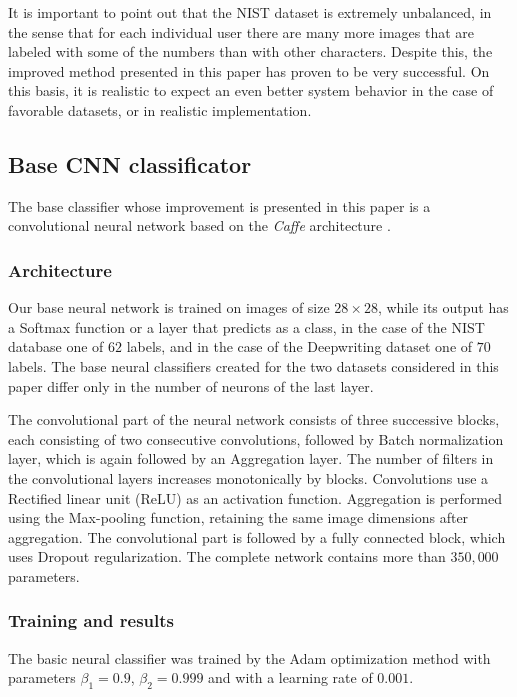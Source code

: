 \documentclass{article}
\begin{document}
It is important to point out that the NIST dataset is extremely unbalanced, in the sense that for each individual user there are many more images that are
labeled with some of the numbers than with other characters.
Despite this, the improved method presented in this paper has proven to be very successful.
On this basis, it is realistic to expect an even better system behavior in the case of favorable datasets, or in realistic implementation.

\subsection{Base CNN classificator}

The base classifier whose improvement is presented in this paper is a convolutional neural network based on the \textit{Caffe} architecture \citep{caffe}.

\subsubsection{Architecture}

Our base neural network is trained on images of size $28 \times 28$, while its output has a Softmax function or a layer that predicts as a class, in the case of the NIST database one of $62$ labels,
and in the case of the Deepwriting dataset one of $70$ labels.
The base neural classifiers created for the two datasets considered in this paper differ only in the number of neurons of the last layer.

The convolutional part of the neural network consists of three successive blocks, each consisting of two consecutive convolutions, followed by Batch normalization layer,
which is again followed by an Aggregation layer.
The number of filters in the convolutional layers increases monotonically by blocks.
Convolutions use a Rectified linear unit (ReLU) as an activation function.
Aggregation is performed using the Max-pooling function, retaining the same image dimensions after aggregation.
The convolutional part is followed by a fully connected block, which uses Dropout regularization.
The complete network contains more than $350,000$ parameters.

\subsubsection{Training and results}

The basic neural classifier was trained by the Adam optimization method with parameters $\beta_1=0.9$, $\beta_2=0.999$ and with a learning rate of $0.001$.
\end{document}
